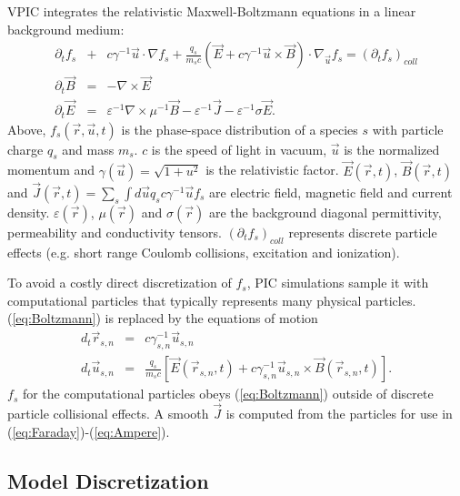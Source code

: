 \documentclass[10pt]{article}
\newcommand{\eps}{\varepsilon}
\newcommand{\vecr}{\vec{r}}
\newcommand{\vecu}{\vec{u}}
\newcommand{\vecJ}{\vec{J}}
\newcommand{\vecE}{\vec{E}}
\newcommand{\vecB}{\vec{B}}
\newcommand{\Deriv}[2]{d_{#2}#1}
\newcommand{\PDeriv}[2]{\partial_{#2}#1}
\newcommand{\DotP}[2]{#1 \cdot #2}
\newcommand{\CrossP}[2]{#1 \times #2}
\newcommand{\Grad}[1]{\nabla #1}
\newcommand{\Curl}[1]{\nabla \times #1}
\newcommand{\Gradu}[1]{\nabla_{\vecu} #1}
\newcommand{\eq}[1]{(\ref{eq:#1})}
\begin{document}
VPIC integrates the relativistic Maxwell-Boltzmann equations in a
linear background medium:
\begin{eqnarray}
\PDeriv{f_s}{t} &+& 
\DotP{c\gamma^{-1}\vecu}{\Grad{f_s}} +
\DotP{\frac{q_s}{m_s c}\left(\vecE+\CrossP{c\gamma^{-1}\vecu}{\vecB}\right)}
{\Gradu{f_s}} = \left(\PDeriv{f_s}{t}\right)_{coll} \label{eq:Boltzmann}\\
\PDeriv{\vecB}{t} &=& -\Curl{\vecE} \label{eq:Faraday}\\
\PDeriv{\vecE}{t} &=&
\eps^{-1}\Curl{\mu^{-1}\vecB} - \eps^{-1}\vecJ - \eps^{-1}\sigma\vecE
\label{eq:Ampere}
.
\end{eqnarray}
Above, $f_s\left(\vecr,\vecu,t\right)$ is the phase-space distribution
of a species $s$ with particle charge $q_s$ and mass $m_s$.  $c$ is
the speed of light in vacuum, $\vecu$ is the normalized momentum and
$\gamma\left(\vecu\right) = \sqrt{1 + u^2}$ is the relativistic
factor.  $\vecE\left(\vecr,t\right)$, $\vecB\left(\vecr,t\right)$ and
$\vecJ\left(\vecr,t\right) = \sum_s \int d\vecu q_s c\gamma^{-1}\vecu
f_s$ are electric field, magnetic field and current density.
$\eps\left(\vecr\right)$, $\mu\left(\vecr\right)$ and
$\sigma\left(\vecr\right)$ are the background diagonal permittivity,
permeability and conductivity tensors.
$\left(\PDeriv{f_s}{t}\right)_{coll}$ represents discrete particle
effects (e.g. short range Coulomb collisions, excitation and
ionization).

To avoid a costly direct discretization of $f_s$, PIC simulations
sample it with computational particles that typically represents many
physical particles.  \eq{Boltzmann} is replaced by the equations of
motion
\begin{eqnarray}
\Deriv{\vecr_{s,n}}{t} &=& c \gamma_{s,n}^{-1} \vecu_{s,n} \label{eq:Position}\\
\Deriv{\vecu_{s,n}}{t} &=& \frac{q_s}{m_s c} \left[
\vecE\left(\vecr_{s,n},t\right) +
\CrossP{c\gamma_{s,n}^{-1}\vecu_{s,n}}{\vecB\left(\vecr_{s,n},t\right)}
\right] \label{eq:Momentum}
.
\end{eqnarray}
$f_s$ for the computational particles obeys \eq{Boltzmann} outside of
discrete particle collisional effects.  A smooth $\vecJ$ is computed
from the particles for use in \eq{Faraday}-\eq{Ampere}.

\subsection{Model Discretization}
\end{document}
